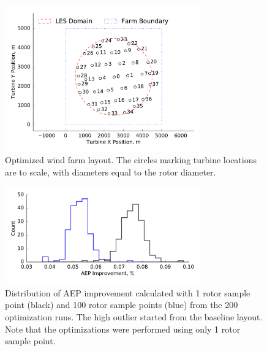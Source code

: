 \documentclass[conf]{new-aiaa}
\begin{document}
\begin{figure}[ht]
	\centering
	\includegraphics[width=0.75\textwidth]{final_images/round_farm_38Turbines_5DSpacing_finish.pdf}
	\caption{Optimized wind farm layout. The circles marking turbine locations are to scale, with diameters equal to the rotor diameter.}
	\label{fig:optimized-layout}
\end{figure}

\begin{figure}[ht]
	\centering
	\includegraphics[width=0.75\textwidth]{final_images/38turbs_results_hist_aep.pdf}
	\caption{Distribution of AEP improvement calculated with 1 rotor sample point (black) and 100 rotor sample points (blue) from the 200 optimization runs. The high outlier started from the baseline layout. Note that the optimizations were performed using only 1 rotor sample point.}
	\label{fig:opt-distribution}
\end{figure}
\end{document}
